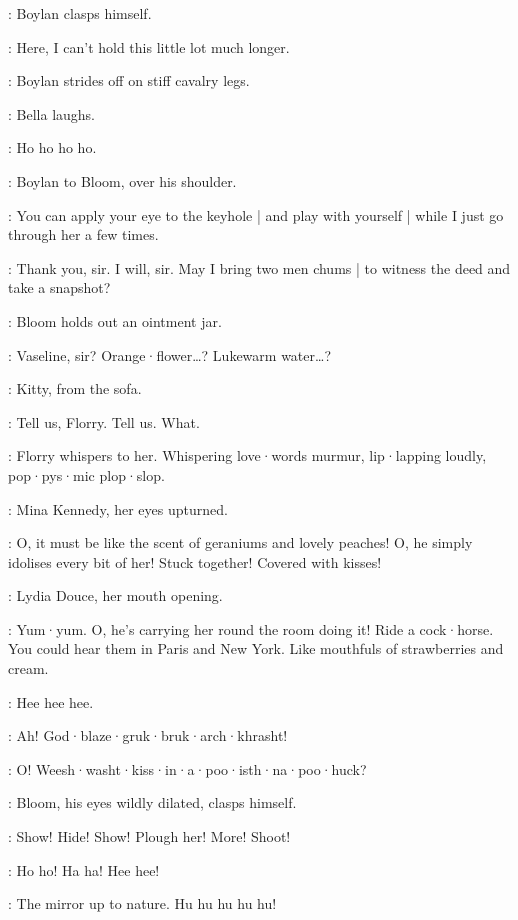 :
Boylan clasps himself.

\Boylan:
Here,
I can't hold this little lot much longer.

:
Boylan strides off on stiff cavalry legs.

:
Bella laughs.

\Bella:
Ho ho ho ho.

:
Boylan to Bloom,
over his shoulder.

\Boylan:
You can apply your eye to the keyhole |
and play with yourself |
while I just go through her a few times.

\Bloom:
Thank you,
sir.
I will,
sir.
May I bring two men chums |
to witness the deed and take a snapshot?

:
Bloom holds out an ointment jar.

\Bloom:
Vaseline,
sir?
Orange·flower…?
Lukewarm water…?

:
Kitty,
from the sofa.

\Kitty:
Tell us,
Florry.
Tell us.
What.

:
Florry whispers to her.
Whispering love·words murmur,
lip·lapping loudly,
pop·pys·mic plop·slop.

:
Mina Kennedy,
her eyes upturned.

\MinaKennedy:
O,
it must be like the scent of geraniums and lovely peaches!
%
O,
he simply idolises every bit of her!
Stuck together!
Covered with kisses!

:
Lydia Douce,
her mouth opening.

\LydiaDouce:
Yum·yum.
O,
he's carrying her round the room doing it!
Ride a cock·horse.
You could hear them in Paris and New York.
Like mouthfuls of strawberries and cream.

\Kitty:
Hee hee hee.

\BoylansVoice:
Ah!
God·blaze·gruk·bruk·arch·khrasht!%

\MarionsVoice:
O!
Weesh·washt·kiss·in·a·poo·isth·na·poo·huck?

:
Bloom,
his eyes wildly dilated,
clasps himself.

\Bloom:
Show!
Hide!
Show!
Plough her!
More!
Shoot!

\BellaZoeFlorryKitty:
Ho ho!
Ha ha!
Hee hee!

\Lynch:
The mirror up to nature.
%
Hu hu hu hu hu!

